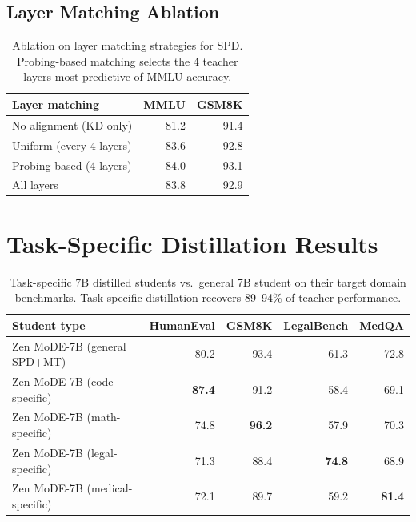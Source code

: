 \documentclass[11pt,a4paper]{article}
\begin{document}
\subsection{Layer Matching Ablation}

\begin{table}[H]
\centering
\caption{Ablation on layer matching strategies for SPD. Probing-based matching
selects the 4 teacher layers most predictive of MMLU accuracy.}
\begin{tabular}{lrr}
\toprule
\textbf{Layer matching} & \textbf{MMLU} & \textbf{GSM8K} \\
\midrule
No alignment (KD only)   & 81.2 & 91.4 \\
Uniform (every 4 layers) & 83.6 & 92.8 \\
Probing-based (4 layers) & 84.0 & 93.1 \\
All layers               & 83.8 & 92.9 \\
\bottomrule
\end{tabular}
\label{tab:layer_ablation}
\end{table}

\section{Task-Specific Distillation Results}
\label{sec:task_specific}

\begin{table}[H]
\centering
\caption{Task-specific 7B distilled students vs.\ general 7B student on their target
domain benchmarks. Task-specific distillation recovers 89--94\% of teacher performance.}
\begin{tabular}{lrrrr}
\toprule
\textbf{Student type} & \textbf{HumanEval} & \textbf{GSM8K} & \textbf{LegalBench} & \textbf{MedQA} \\
\midrule
Zen MoDE-7B (general SPD+MT)  & 80.2 & 93.4 & 61.3 & 72.8 \\
Zen MoDE-7B (code-specific)   & \textbf{87.4} & 91.2 & 58.4 & 69.1 \\
Zen MoDE-7B (math-specific)   & 74.8 & \textbf{96.2} & 57.9 & 70.3 \\
Zen MoDE-7B (legal-specific)  & 71.3 & 88.4 & \textbf{74.8} & 68.9 \\
Zen MoDE-7B (medical-specific)& 72.1 & 89.7 & 59.2 & \textbf{81.4} \\
\bottomrule
\end{tabular}
\label{tab:task_specific}
\end{table}
\end{document}

